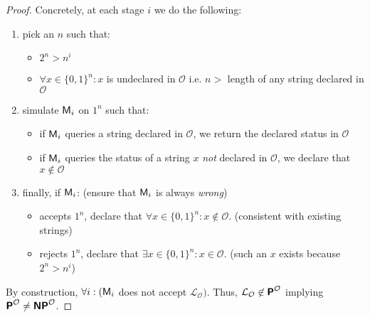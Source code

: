 \documentclass[usletter]{article}
\newcommand {\langset}[1]      {\ensuremath{\mathcal{#1}}}
\newcommand {\machine}[1]      {\ensuremath{\textnormal{\textsf{#1}}}}
\newcommand {\family}[1]       {\ensuremath{\textnormal{\textsf{\textbf{#1}}}}}
\begin{document}
\begin{proof}
\noindent
Concretely, at each stage $i$ we do the following:
\begin{enumerate}
  \item pick an $n$ such that:
  \begin{itemize}
    \item $2^n > n^i$
    \item $\forall x \in \{0, 1\}^n : x$ is undeclared in \langset{O}
      i.e. $n >$ length of any string declared in \langset{O}
  \end{itemize}
  \item simulate $\machine{M}_i$ on $1^n$ such that:
  \begin{itemize}
    \item if $\machine{M}_i$ queries a string declared in \langset{O},
      we return the declared status in \langset{O}
    \item if $\machine{M}_i$ queries the status of a string $x$ \textit{not}
      declared in \langset{O}, we declare that $x \not\in \langset{O}$
  \end{itemize}
  \item finally, if $\machine{M}_i$:
    \hfill (ensure that $\machine{M}_i$ is always \textit{wrong})
  \begin{itemize}
    \item accepts $1^n$, declare that
      $\forall x \in \{0,1\}^n : x \not\in \langset{O}$.
      \hfill (consistent with existing strings)
    \item rejects $1^n$, declare that
      $\exists x \in \{0,1\}^n : x \in \langset{O}$.
      \hfill (such an $x$ exists because $2^n > n^i$)
  \end{itemize}
\end{enumerate}
By construction,
$\forall i : (\machine{M}_i$ does not accept $\langset{L}_\langset{O})$.
Thus, $\langset{L}_\langset{O} \not\in \family{P}^\langset{O}$ implying
$\family{P}^\langset{O} \neq \family{NP}^\langset{O}$.
\end{proof}



\end{document}
